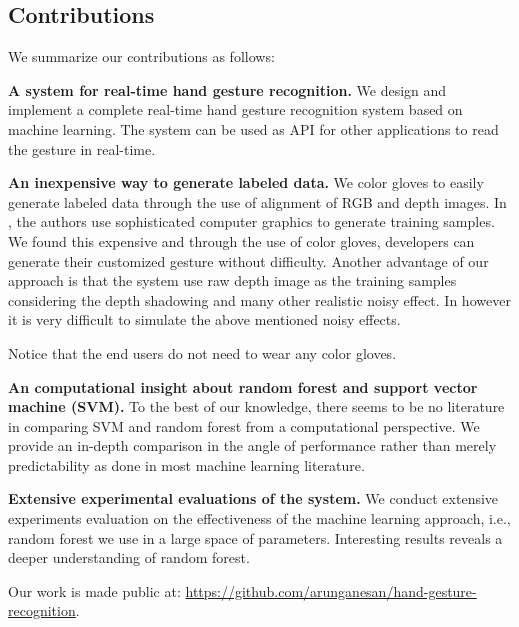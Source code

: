 \subsection{Contributions}

We summarize our contributions as follows:

\textbf{A system for real-time hand gesture recognition.} We design and implement a complete real-time hand gesture recognition system based on machine learning. The system can be used as API for other applications to read the gesture in real-time.

\textbf{An inexpensive way to generate labeled data.} We color gloves to easily generate labeled data through the use of alignment of RGB and depth images. In \cite{shotton2011}, the authors use sophisticated computer graphics to generate training samples. We found this expensive and through the use of color gloves, developers can generate their customized gesture without difficulty. Another advantage of our approach is that the system use raw depth image as the training samples considering the depth shadowing and many other realistic noisy effect. In  however it is very difficult to simulate the above mentioned noisy effects. 

 Notice that the end users do not need to wear any color gloves. 

\textbf{An computational insight about random forest and support vector machine (SVM).} To the best of our knowledge, there seems to be no literature in comparing  SVM and random forest from a computational perspective. We provide an in-depth comparison in the angle of performance rather than merely predictability as done in most machine learning literature. 

\textbf{Extensive experimental evaluations of the system.} We conduct extensive experiments evaluation on the effectiveness of the machine learning approach, i.e., random forest we use in a large space of parameters. Interesting results reveals a deeper understanding of random forest. 

Our work is made public at: \url{https://github.com/arunganesan/hand-gesture-recognition}.